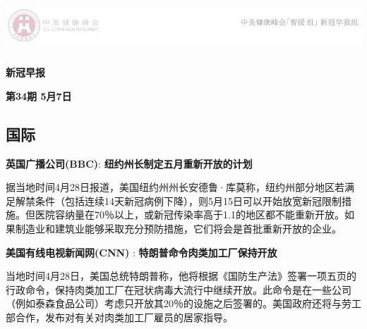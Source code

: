 \documentclass[
]{article}
\author{}
\date{\vspace{-2.5em}}
\begin{document}
\fontsize{22}{22}
\selectfont
\vspace{-10truemm}

\newcommand{\resheading}[1]{%
  \noindent\fcolorbox{lavenderblush}{lavenderblush}{\makebox[\dimexpr\textwidth-2\fboxsep-2\fboxrule][l]{\textbf{~#1}}}%
}

\begin{center}
\includegraphics[height=2cm]{./input/logo2.png} 
\end{center}

\begin{center}
\fontsize{45}{45}
\textcolor{glaucous}{\textbf{新冠早报}}
\end{center}

\begin{center}
\fontsize{22}{22}
{\textcolor{glaucous}{\textbf{第34期 \space 5月7日}}}
\end{center}

%
  \noindent{}%

\vspace{-5mm}

\hypertarget{section}{%
\subsection{\texorpdfstring{\textcolor{glaucous}{\Huge 国际}}{}}\label{section}}

\vspace{-3mm}

\textbf{\textcolor{glaucous}{英国广播公司(BBC)}}:
\textbf{纽约州长制定五月重新开放的计划 }

据当地时间4月28日报道，美国纽约州州长安德鲁·库莫称，纽约州部分地区若满足解禁条件（包括连续14天新冠病例下降），则5月15日可以开始放宽新冠限制措施。但医院容纳量在70％以上，或新冠传染率高于1.1的地区都不能重新开放。如果制造业和建筑业能够采取充分预防措施，它们将会是首批重新开放的企业。

\textbf{\textcolor{glaucous}{美国有线电视新闻网(CNN)}} :
\textbf{特朗普命令肉类加工厂保持开放}

当地时间4月28日，美国总统特朗普称，他将根据《国防生产法》签署一项五页的行政命令，保持肉类加工厂在冠状病毒大流行中继续开放。此命令是在一些公司（例如泰森食品公司）考虑只开放其20％的设施之后签署的。美国政府还将与劳工部合作，发布对有关对肉类加工厂雇员的居家指导。
\end{document}
